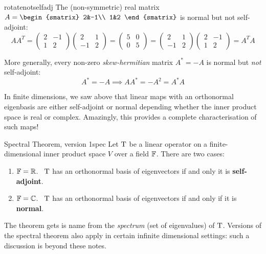 \begin{example}{}{rotatenotselfadj}
	The (non-symmetric) real matrix $A=
	\begin{smatrix}
		2&-1\\
		1&2
	\end{smatrix}$ is normal but not self-adjoint:
	\[
		AA^T=
		\begin{pmatrix}
			2&-1\\
			1&2
		\end{pmatrix}
		\begin{pmatrix}
			2&1\\
			-1&2
		\end{pmatrix}
		=
		\begin{pmatrix}
			5&0\\
			0&5
		\end{pmatrix}
		=
		\begin{pmatrix}
			2&1\\
			-1&2
		\end{pmatrix}
		\begin{pmatrix}
			2&-1\\
			1&2
		\end{pmatrix}
		=A^TA
	\]
\end{example}

More generally, every non-zero \emph{skew-hermitian} matrix $A^*=-A$ is normal but \emph{not} self-adjoint:
\[
	A^*=-A\implies AA^*=-A^2=A^*A
\]

In finite dimensions, we saw above that linear maps with an orthonormal eigenbasis are either self-adjoint or normal depending whether the inner product space is real or complex. Amazingly, this provides a complete characterisation of such maps!


\begin{thm}{Spectral Theorem, version 1}{spec}
	Let $\mathrm{T}$ be a linear operator on a finite-dimensional inner product space $V$ over a field $\mathbb{F}$. There are two cases:
	\begin{enumerate}
		\item $\mathbb{F}=\mathbb{R}$. \ $\mathrm{T}$ has an orthonormal basis of eigenvectors if and only it is \textbf{self-adjoint}.
		\item $\mathbb{F}=\mathbb{C}$. \ $\mathrm{T}$ has an orthonormal basis of eigenvectors if and only if it is \textbf{normal}.
	\end{enumerate}
\end{thm}

The theorem gets is name from the \emph{spectrum} (set of eigenvalues) of $\mathrm{T}$. Versions of the spectral theorem also apply in certain infinite dimensional settings: such a discussion is beyond these notes.


